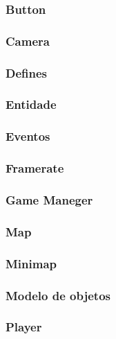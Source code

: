 \subsubsection{Button}

\subsubsection{Camera}

\subsubsection{Defines}

\subsubsection{Entidade}

\subsubsection{Eventos}

\subsubsection{Framerate}

\subsubsection{Game Maneger}

\subsubsection{Map}

\subsubsection{Minimap}

\subsubsection{Modelo de objetos}

\subsubsection{Player}

